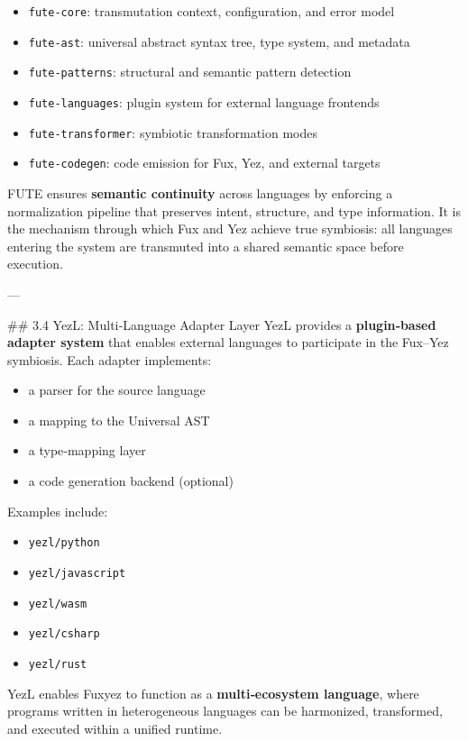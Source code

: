 \begin{itemize}
  \item \texttt{fute-core}: transmutation context, configuration, and error model  
  \item \texttt{fute-ast}: universal abstract syntax tree, type system, and metadata  
  \item \texttt{fute-patterns}: structural and semantic pattern detection  
  \item \texttt{fute-languages}: plugin system for external language frontends  
  \item \texttt{fute-transformer}: symbiotic transformation modes  
  \item \texttt{fute-codegen}: code emission for Fux, Yez, and external targets  
\end{itemize}

FUTE ensures \textbf{semantic continuity} across languages by enforcing a normalization pipeline that preserves intent, structure, and type information. It is the mechanism through which Fux and Yez achieve true symbiosis: all languages entering the system are transmuted into a shared semantic space before execution.

---

\#\# 3.4 YezL: Multi‑Language Adapter Layer  
YezL provides a \textbf{plugin‑based adapter system} that enables external languages to participate in the Fux–Yez symbiosis. Each adapter implements:

\begin{itemize}
  \item a parser for the source language  
  \item a mapping to the Universal AST  
  \item a type‑mapping layer  
  \item a code generation backend (optional)  
\end{itemize}

Examples include:

\begin{itemize}
  \item \texttt{yezl/python}  
  \item \texttt{yezl/javascript}  
  \item \texttt{yezl/wasm}  
  \item \texttt{yezl/csharp}  
  \item \texttt{yezl/rust}  
\end{itemize}

YezL enables Fuxyez to function as a \textbf{multi‑ecosystem language}, where programs written in heterogeneous languages can be harmonized, transformed, and executed within a unified runtime.

